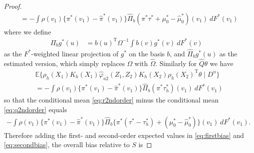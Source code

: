 \documentclass[11pt,twoside]{article}
\def\T{{ \mathrm{\scriptscriptstyle T} }}
\newcommand{\E}{\mathbb{E}}
\theoremstyle{definition}
\theoremstyle{remark}
\begin{document}
\begin{proof}
\begin{align}
&= - \int \rho(v_1)\{\pi^*(v_1) - \widehat\pi^*(v_1)\} \widehat\Pi_{b}(\pi^* \tau^* + \mu_0^*-\widehat\mu_0^*)(v_1) \ dF^*(v_1) \nonumber
\end{align}
where we define
\begin{align*}
\Pi_{b}g^*(u) &= b(u)^\T \Omega^{-1} \int {b}(v) g^*(v) \ dF^*(v) 
\end{align*}
as the $F^*$-weighted linear projection of $g^*$ on the basis $b$, and $\widehat\Pi_{b} g^*(u)$ as the estimated version, which simply replaces $\Omega$ with $\widehat\Omega$. Similarly for $\widehat{Q}\theta$ we have
\begin{align}
&\E\{   \rho_h(X_1) K_h(X_1) \widehat\varphi_{a2}(Z_1,Z_2)K_h(X_2) \rho_h(X_2)^\T \theta \mid D^n \} \label{eq:q2ndorder}  \\
&= - \int \rho(v_1) \{ \pi^*(v_1) - \widehat\pi^*(v_1) \} \widehat\Pi_{b}(\pi^* \tau_h^*)(v_1) \ dF^*(v_1)  \nonumber
\end{align}
so that the conditional mean \eqref{eq:r2ndorder} minus the  conditional mean \eqref{eq:q2ndorder} equals
\begin{align}
 - \int \rho(v_1)\{\pi^*(v_1) - \widehat\pi^*(v_1)\} \widehat\Pi_{b}\{ \pi^* ( \tau^* - \tau_h^* ) + (\mu_0^*-\widehat\mu_0^*)\}(v_1) \ dF^*(v_1) . \label{eq:secondbias}
\end{align}
Therefore adding the first- and second-order expected values in \eqref{eq:firstbias} and \eqref{eq:secondbias},  the overall bias relative to $S$ is

\end{proof}
\end{document}
